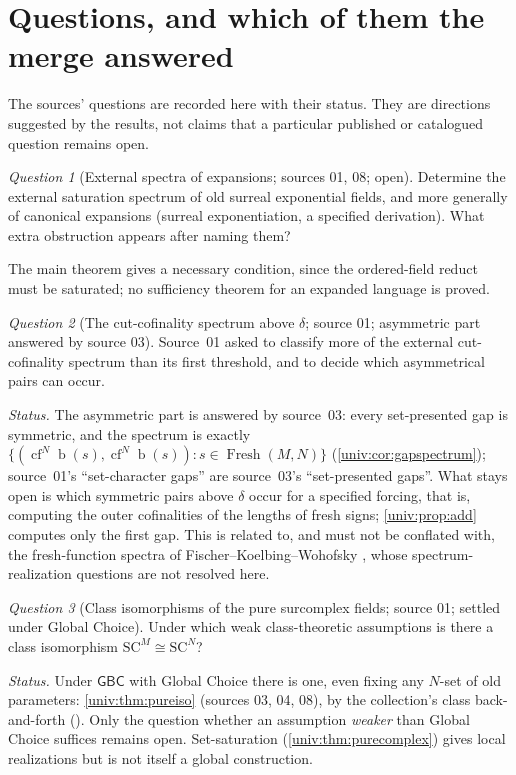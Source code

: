 \documentclass[11pt,letterpaper]{article}
\numberwithin{equation}{section}
\theoremstyle{definition}
\theoremstyle{remark}
\newtheorem{question}[question]{Question}
\newcommand{\SC}{\mathrm{SC}}
\newcommand{\SCM}{\SC^{M}}
\newcommand{\SCN}{\SC^{N}}
\newcommand{\bd}{\operatorname{b}}
\newcommand{\cf}{\operatorname{cf}}
\newcommand{\Fresh}{\operatorname{Fresh}}
\newcommand{\GBC}{\mathsf{GBC}}
\begin{document}
\section{Questions, and which of them the merge answered}\label{univ:sec:questions}

The sources' questions are recorded here with their status. They are
directions suggested by the results, not claims that a particular published or
catalogued question remains open.

\begin{question}[External spectra of expansions; sources 01, 08; open]\label{univ:q:exponential}
Determine the external saturation spectrum of old surreal exponential fields,
and more generally of canonical expansions (surreal exponentiation, a specified
derivation). What extra obstruction appears after naming them?
\end{question}
The main theorem gives a necessary condition, since the ordered-field reduct
must be saturated; no sufficiency theorem for an expanded language is proved.

\begin{question}[The cut-cofinality spectrum above $\delta$; source 01; asymmetric part answered by source 03]\label{univ:q:cutspectrum}
Source~01 asked to classify more of the external cut-cofinality spectrum than
its first threshold, and to decide which asymmetrical pairs can occur.
\end{question}
\emph{Status.} The asymmetric part is answered by source~03: every
set-presented gap is symmetric, and the spectrum is exactly
$\{(\cf^N\bd(s),\cf^N\bd(s)):s\in\Fresh(M,N)\}$
(\cref{univ:cor:gapspectrum}); source~01's ``set-character gaps'' are source~03's
``set-presented gaps''. What stays open is which symmetric pairs above $\delta$
occur for a specified forcing, that is, computing the outer cofinalities of the
lengths of fresh signs; \cref{univ:prop:add} computes only the first gap. This
is related to, and must not be conflated with, the fresh-function spectra of
Fischer--Koelbing--Wohofsky \cite{FKW}, whose spectrum-realization questions
are not resolved here.

\begin{question}[Class isomorphisms of the pure surcomplex fields; source 01; settled under Global Choice]\label{univ:q:classiso}
Under which weak class-theoretic assumptions is there a class isomorphism
$\SCM\cong\SCN$?
\end{question}
\emph{Status.} Under $\GBC$ with Global Choice there is one, even fixing any
$N$-set of old parameters: \cref{univ:thm:pureiso} (sources 03, 04, 08), by the
collection's class back-and-forth (). Only the
question whether an assumption \emph{weaker} than Global Choice suffices
remains open. Set-saturation (\cref{univ:thm:purecomplex}) gives local
realizations but is not itself a global construction.
\end{document}
